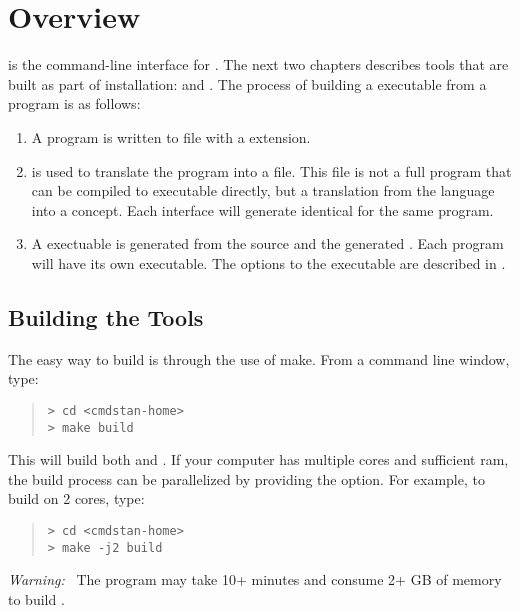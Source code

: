 \chapter{Overview}

\noindent
\CmdStan is the command-line interface for \Stan. The next two
chapters describes tools that are built as part of \CmdStan
installation:  and . The process of building a
\CmdStan executable from a \Stan program is as follows:
%
\begin{enumerate}
  \item A \Stan program is written to file with a 
    extension.
  \item {} is used to translate the \Stan program into a
    \Cpp file. This \Cpp file is not a full program that can be
    compiled to executable directly, but a translation from the \Stan
    language into a \Cpp concept. Each interface will generate identical
    \Cpp for the same \Stan program.
  \item A \CmdStan exectuable is generated from the \CmdStan source
    and the generated \Cpp. Each \Stan program will have its own
    \CmdStan executable. The options to the \CmdStan executable are
    described in .
\end{enumerate}


\section{Building the \CmdStan Tools}\label{build.section}

The easy way to build \CmdStan is through the use of make. From a
command line window, type:
%
\begin{quote}
\begin{Verbatim}[fontshape=sl,fontsize=\small]
> cd <cmdstan-home>
> make build
\end{Verbatim}
\end{quote}
%
This will build both  and . If your computer
has multiple cores and sufficient ram, the build process can be parallelized
by providing the  option. For example, to build on 2 cores, type:
%
\begin{quote}
\begin{Verbatim}[fontshape=sl,fontsize=\small]
> cd <cmdstan-home>
> make -j2 build
\end{Verbatim}
\end{quote}
%
\emph{Warning:} \ The  program may take 10+ minutes and
consume 2+ GB of memory to build \CmdStan.
